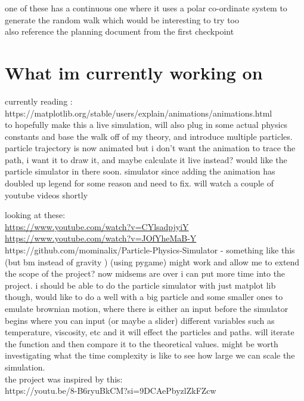 \documentclass[12pt]{article}
\begin{document}
one of these has a continuous one where it uses a polar co-ordinate system to generate the random walk which would be interesting to try too\\

also reference the planning document from the first checkpoint

\section{What im currently working on}
currently reading :\\
https://matplotlib.org/stable/users/explain/animations/animations.html\\
to hopefully make this a live simulation, will also plug in some actual physics constants and base the walk off of my theory, and introduce multiple particles.\\
particle trajectory is now animated but i don't want the animation to trace the path, i want it to draw it, and maybe calculate it live instead? would like the particle simulator in there soon. simulator since adding the animation has doubled up legend for some reason and need to fix. will watch a couple of youtube videos shortly 

looking at these:\\
\url{https://www.youtube.com/watch?v=CYlsadpjyiY} \\

\url{https://www.youtube.com/watch?v=JOfYheMaB-Y} \\

https://github.com/mominalix/Particle-Physics-Simulator - something like this (but bm instead of gravity ) (using pygame) might work and allow me to extend the scope of the project? now midsems are over i can put more time into the project. i should be able to do the particle simulator with just matplot lib though, would like to do a well with a big particle and some smaller ones to emulate brownian motion, where there is either an input before the simulator begins where you can input (or maybe a slider) different variables such as temperature, viscosity, etc and it will effect the particles and paths. will iterate the function and then compare it to the theoretical values. might be worth investigating what the time complexity is like to see how large we can scale the simulation. \\

the project was inspired by this:\\
https://youtu.be/8-B6ryuBkCM?si=9DCAePbyzlZkFZcw
\end{document}

